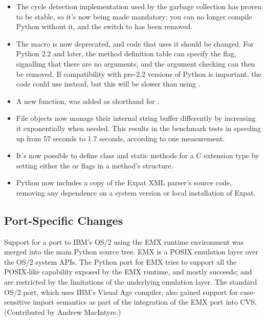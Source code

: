 \documentclass{howto}
\begin{document}
\begin{itemize}
\item The cycle detection implementation used by the garbage collection
has proven to be stable, so it's now being made mandatory; you can no
longer compile Python without it, and the
 switch to  has been removed.

\item The  macro is now deprecated, and code
that uses it should be changed.  For Python 2.2 and later, the method
definition table can specify the
 flag, signalling that there are no arguments, and
the argument checking can then be removed.  If compatibility with
pre-2.2 versions of Python is important, the code could use
 instead, but this will be slower
than using .

\item A new function,  was added
as shorthand for
.

\item File objects now manage their internal string buffer
differently by increasing it exponentially when needed.
This results in the benchmark tests in 
speeding up from 57 seconds to 1.7 seconds, according to one
measurement.

\item It's now possible to define class and static methods for a C
extension type by setting either the  or
 flags in a method's 
structure.

\item Python now includes a copy of the Expat XML parser's source code,
removing any dependence on a system version or local installation of
Expat.

\end{itemize}

\subsection{Port-Specific Changes}

Support for a port to IBM's OS/2 using the EMX runtime environment was
merged into the main Python source tree.  EMX is a POSIX emulation
layer over the OS/2 system APIs.  The Python port for EMX tries to
support all the POSIX-like capability exposed by the EMX runtime, and
mostly succeeds;  and  are
restricted by the limitations of the underlying emulation layer.  The
standard OS/2 port, which uses IBM's Visual Age compiler, also gained
support for case-sensitive import semantics as part of the integration
of the EMX port into CVS.  (Contributed by Andrew MacIntyre.)
\end{document}
